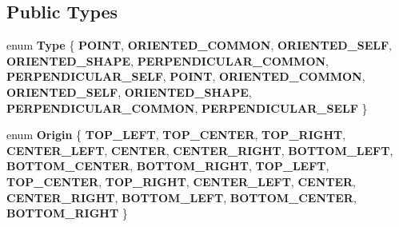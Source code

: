\subsection*{Public Types}
\begin{DoxyCompactItemize}
\item 
\mbox{\label{classPUParticle3DQuadRender_adafb7cfaacc368932721838dff58fc3e}} 
enum {\bfseries Type} \{ \newline
{\bfseries P\+O\+I\+NT}, 
{\bfseries O\+R\+I\+E\+N\+T\+E\+D\+\_\+\+C\+O\+M\+M\+ON}, 
{\bfseries O\+R\+I\+E\+N\+T\+E\+D\+\_\+\+S\+E\+LF}, 
{\bfseries O\+R\+I\+E\+N\+T\+E\+D\+\_\+\+S\+H\+A\+PE}, 
\newline
{\bfseries P\+E\+R\+P\+E\+N\+D\+I\+C\+U\+L\+A\+R\+\_\+\+C\+O\+M\+M\+ON}, 
{\bfseries P\+E\+R\+P\+E\+N\+D\+I\+C\+U\+L\+A\+R\+\_\+\+S\+E\+LF}, 
{\bfseries P\+O\+I\+NT}, 
{\bfseries O\+R\+I\+E\+N\+T\+E\+D\+\_\+\+C\+O\+M\+M\+ON}, 
\newline
{\bfseries O\+R\+I\+E\+N\+T\+E\+D\+\_\+\+S\+E\+LF}, 
{\bfseries O\+R\+I\+E\+N\+T\+E\+D\+\_\+\+S\+H\+A\+PE}, 
{\bfseries P\+E\+R\+P\+E\+N\+D\+I\+C\+U\+L\+A\+R\+\_\+\+C\+O\+M\+M\+ON}, 
{\bfseries P\+E\+R\+P\+E\+N\+D\+I\+C\+U\+L\+A\+R\+\_\+\+S\+E\+LF}
 \}
\item 
\mbox{\label{classPUParticle3DQuadRender_afa05e4913c569c21f4ff77bd95160924}} 
enum {\bfseries Origin} \{ \newline
{\bfseries T\+O\+P\+\_\+\+L\+E\+FT}, 
{\bfseries T\+O\+P\+\_\+\+C\+E\+N\+T\+ER}, 
{\bfseries T\+O\+P\+\_\+\+R\+I\+G\+HT}, 
{\bfseries C\+E\+N\+T\+E\+R\+\_\+\+L\+E\+FT}, 
\newline
{\bfseries C\+E\+N\+T\+ER}, 
{\bfseries C\+E\+N\+T\+E\+R\+\_\+\+R\+I\+G\+HT}, 
{\bfseries B\+O\+T\+T\+O\+M\+\_\+\+L\+E\+FT}, 
{\bfseries B\+O\+T\+T\+O\+M\+\_\+\+C\+E\+N\+T\+ER}, 
\newline
{\bfseries B\+O\+T\+T\+O\+M\+\_\+\+R\+I\+G\+HT}, 
{\bfseries T\+O\+P\+\_\+\+L\+E\+FT}, 
{\bfseries T\+O\+P\+\_\+\+C\+E\+N\+T\+ER}, 
{\bfseries T\+O\+P\+\_\+\+R\+I\+G\+HT}, 
\newline
{\bfseries C\+E\+N\+T\+E\+R\+\_\+\+L\+E\+FT}, 
{\bfseries C\+E\+N\+T\+ER}, 
{\bfseries C\+E\+N\+T\+E\+R\+\_\+\+R\+I\+G\+HT}, 
{\bfseries B\+O\+T\+T\+O\+M\+\_\+\+L\+E\+FT}, 
\newline
{\bfseries B\+O\+T\+T\+O\+M\+\_\+\+C\+E\+N\+T\+ER}, 
{\bfseries B\+O\+T\+T\+O\+M\+\_\+\+R\+I\+G\+HT}
 \}
\item 

\end{DoxyCompactItemize}
